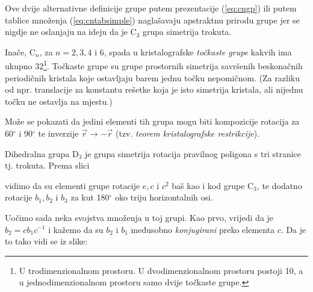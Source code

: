 Ove dvije alternativne definicije grupe putem prezentacije (\ref{eq:cngp}) ili
putem tablice množenja (\ref{eq:cntabsimple}) 
naglašavaju apstraktnu prirodu grupe jer se nigdje ne oslanjaju
na ideju da je C$_3$ grupa simetrija trokuta.

Inače, C$_n$, za $n=2,3,4$ i $6$, spada u kristalografske \emph{točkaste grupe} kakvih
ima ukupno 32\footnote{U trodimenzionalnom prostoru. U dvodimenzionalnom prostoru postoji 10, a u
jednodimenzionalnom prostoru samo dvije točkaste grupe.}. 
Točkaste grupe su grupe prostornih simetrija savršenih beskonačnih
periodičnih kristala koje ostavljaju barem jednu točku nepomičnom. (Za
razliku od npr. translacije za konstantu rešetke koja je isto simetrija
kristala, ali nijednu točku ne ostavlja na mjestu.)
  
Može se pokazati da jedini elementi tih grupa mogu biti kompozicije
rotacija za 60$^\circ$ i 90$^\circ$ te inverzije $\vec{r}\to -\vec{r}$
(tzv. \emph{teorem kristalografske restrikcije}).
   

\begin{primjer}
    Dihedralna grupa $\mathrm{D}_3$ je grupa simetrija rotacija pravilnog poligona s tri
    stranice tj. trokuta.  Prema slici
    \begin{center}
    
    \end{center}
vidimo da su elementi grupe rotacije $e, c$ i  $c^2$ baš kao i kod grupe $\mathrm{C}_3$, te
dodatno rotacije $b_1, b_2$ i $b_3$ za kut 180$^\circ$ oko triju horizontalnih
osi.
\end{primjer}

Uočimo sada neka svojstva množenja u toj grupi. Kao prvo, vrijedi
da je $b_2 = c b_1 c^{-1}$ i kažemo da su $b_2$ i $b_1$ međusobno
\emph{konjugirani} preko elementa $c$. Da je to tako vidi
se iz slike:

\centerline{}

